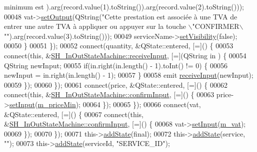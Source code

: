 \begin{DoxyCode}
{{       minimum est %
      ).arg(record.value(1).toString()).arg(record.value(2).toString()));
00048             vat->\hyperlink{classSH__DatabaseContentQuestionState_aff932cdd7974baeea9a477cf0abc5ace}{setOutput}(QString(\textcolor{stringliteral}{"Cette prestation est associée à une TVA de %
       entrer une autre TVA à appliquer ou appuyer sur la touche \(\backslash\)"CONFIRMER\(\backslash\)""}).arg(record.value(3).toString()));
00049             serviceName->\hyperlink{classSH__InOutState_a7fdfaa6f600f0ac4a96f238a038ba9ad}{setVisibility}(\textcolor{keyword}{false});
00050         \}
00051     \});
00052     connect(quantity, &QState::entered, [=]() \{
00053         connect(\textcolor{keyword}{this}, &\hyperlink{classSH__InOutStateMachine_a037ed5e13ecfae2123a8d4940292e410}{SH\_InOutStateMachine::receiveInput}, [=](QString in
      ) \{
00054             QString newInput;
00055             \textcolor{keywordflow}{if}(in.right(in.length() - 1).toInt() != 0) \{
00056                 newInput = in.right(in.length() - 1);
00057             \}
00058             emit \hyperlink{classSH__InOutStateMachine_a037ed5e13ecfae2123a8d4940292e410}{receiveInput}(newInput);
00059         \});
00060     \});
00061     connect(price, &QState::entered, [=]() \{
00062         connect(\textcolor{keyword}{this}, &\hyperlink{classSH__InOutStateMachine_a7f7d9c9300c1d05bce2c26029f28cc31}{SH\_InOutStateMachine::confirmInput}, [=]() \{
00063             price->\hyperlink{classSH__QuestionState_ab40b6202090d1afcc965e124b2deb88a}{setInput}(\hyperlink{classSH__ServiceCharging_a44584a7ff1edd6ae03c4f77544136c13}{m\_priceMin});
00064         \});
00065     \});
00066     connect(vat, &QState::entered, [=]() \{
00067         connect(\textcolor{keyword}{this}, &\hyperlink{classSH__InOutStateMachine_a7f7d9c9300c1d05bce2c26029f28cc31}{SH\_InOutStateMachine::confirmInput}, [=]() \{
00068             vat->\hyperlink{classSH__QuestionState_ab40b6202090d1afcc965e124b2deb88a}{setInput}(\hyperlink{classSH__ServiceCharging_ae2fa75c56883dc4af6b0bbcbb86d0861}{m\_vat});
00069         \});
00070     \});
00071     this->\hyperlink{classSH__InOutStateMachine_a3de9dedcdfd6efab868484c047638f71}{addState}(\textcolor{keyword}{final});
00072     this->\hyperlink{classSH__InOutStateMachine_a3de9dedcdfd6efab868484c047638f71}{addState}(service, \textcolor{stringliteral}{""});
00073     this->\hyperlink{classSH__InOutStateMachine_a3de9dedcdfd6efab868484c047638f71}{addState}(serviceId, \textcolor{stringliteral}{"SERVICE\_ID"});
}}
\end{DoxyCode}
